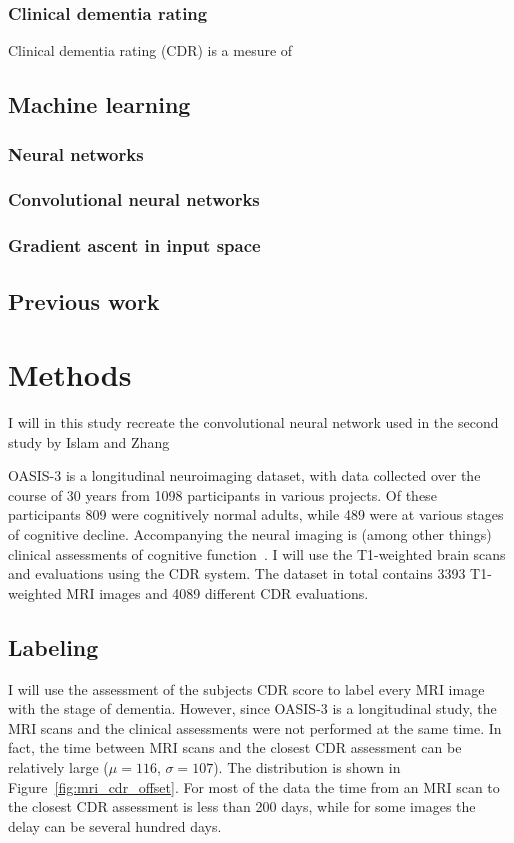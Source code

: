 \documentclass{kththesis}
\begin{document}
\subsection{Clinical dementia rating}
Clinical dementia rating (CDR) is a mesure of

\section{Machine learning}
\subsection{Neural networks}

\subsection{Convolutional neural networks}

\subsection{Gradient ascent in input space}

\section{Previous work}

\chapter{Methods}

I will in this study recreate the convolutional neural network used in the second study by Islam and Zhang

OASIS-3 is a longitudinal neuroimaging dataset, with data collected over the course of 30 years from 1098 participants in various projects. Of these participants 809 were cognitively normal adults, while 489 were at various stages of cognitive decline. Accompanying the neural imaging is (among other things) clinical assessments of cognitive function~\cite{oasis3}. I will use the T1-weighted brain scans and evaluations using the CDR system. The dataset in total contains 3393 T1-weighted MRI images and 4089 different CDR evaluations.

\section{Labeling}
I will use the assessment of the subjects CDR score to label every MRI image with the stage of dementia. However, since OASIS-3 is a longitudinal study, the MRI scans and the clinical assessments were not performed at the same time. In fact, the time between MRI scans and the closest CDR assessment can be relatively large ($\mu=116$, $\sigma=107$). The distribution is shown in Figure~\ref{fig:mri_cdr_offset}. For most of the data the time from an MRI scan to the closest CDR assessment is less than 200 days, while for some images the delay can be several hundred days.
\end{document}
